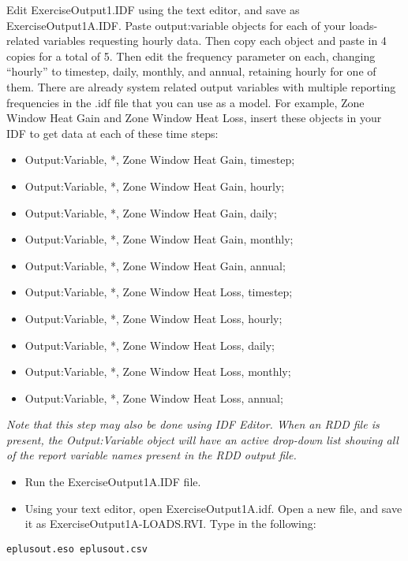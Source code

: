 Edit ExerciseOutput1.IDF using the text editor, and save as ExerciseOutput1A.IDF. Paste output:variable objects for each of your loads-related variables requesting hourly data. Then copy each object and paste in 4 copies for a total of 5. Then edit the frequency parameter on each, changing ``hourly'' to timestep, daily, monthly, and annual, retaining hourly for one of them. There are already system related output variables with multiple reporting frequencies in the .idf file that you can use as a model. For example, Zone Window Heat Gain and Zone Window Heat Loss, insert these objects in your IDF to get data at each of these time steps:

\begin{itemize}
\item
  Output:Variable, *, Zone Window Heat Gain, timestep;
\item
  Output:Variable, *, Zone Window Heat Gain, hourly;
\item
  Output:Variable, *, Zone Window Heat Gain, daily;
\item
  Output:Variable, *, Zone Window Heat Gain, monthly;
\item
  Output:Variable, *, Zone Window Heat Gain, annual;
\item
  Output:Variable, *, Zone Window Heat Loss, timestep;
\item
  Output:Variable, *, Zone Window Heat Loss, hourly;
\item
  Output:Variable, *, Zone Window Heat Loss, daily;
\item
  Output:Variable, *, Zone Window Heat Loss, monthly;
\item
  Output:Variable, *, Zone Window Heat Loss, annual;
\end{itemize}

\emph{Note that this step may also be done using IDF Editor. When an RDD file is present, the Output:Variable object will have an active drop-down list showing all of the report variable names present in the RDD output file.}

\begin{itemize}
\item
  Run the ExerciseOutput1A.IDF file.
\item
  Using your text editor, open ExerciseOutput1A.idf. Open a new file, and save it as ExerciseOutput1A-LOADS.RVI. Type in the following: 
\end{itemize}

\begin{lstlisting}
eplusout.eso eplusout.csv
\end{lstlisting}

